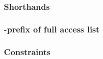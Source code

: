 \subsubsection{Shorthands                          } \label{rlp txn v2: phase constraints: access list: shorthands}            
\subsubsection{\rlp{}-prefix of full access list   } \label{rlp txn v2: phase constraints: access list: access list prefix}    
\subsubsection{Constraints                         } \label{rlp txn v2: phase constraints: access list: constraints}           
